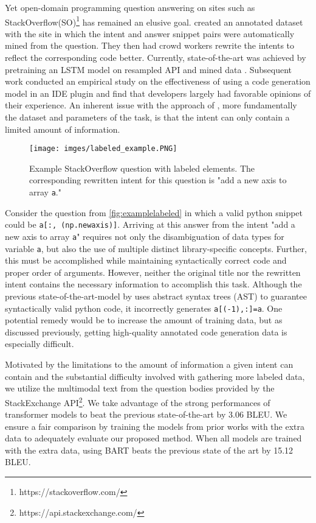 \documentclass[11pt]{article}
\newcommand{\codesnip}[1]{\small\texttt{#1}\normalsize}
\begin{document}
\indent Yet open-domain programming question answering on sites such as StackOverflow(SO)\footnote{https://stackoverflow.com/} has remained an elusive goal. \citet{yin2018learning} created an annotated dataset with the site in which the intent and answer snippet pairs were automatically mined from the question. They then had crowd workers rewrite the intents to reflect the corresponding code better. Currently, state-of-the-art was achieved by pretraining an LSTM model on resampled API and mined data \citep{xu-etal-2020-incorporating}. Subsequent work conducted an empirical study on the effectiveness of using a code generation model in an IDE plugin and find that developers largely had favorable opinions of their experience\citep{xu2021ide}. An inherent issue with the approach of \citet{xu-etal-2020-incorporating}, more fundamentally the dataset and parameters of the task, is that the intent can only contain a limited amount of information. 

\begin{figure}[ht]
    \centering
    \texttt{[image: imges/labeled\_example.PNG]}
    \caption{Example StackOverflow question with labeled elements. The corresponding rewritten intent for this question is "add a new axis to array \codesnip{a}."}
    \label{fig:examplelabeled}
\end{figure}
\indent Consider the question from \autoref{fig:examplelabeled}\textrm{ }in which a valid python snippet could be \codesnip{a[:, (np.newaxis)]}. Arriving at this answer from the intent "add a new axis to array \codesnip{a}" requires not only the disambiguation of data types for variable \codesnip{a}, but also the use of multiple distinct library-specific concepts. Further, this must be accomplished while maintaining syntactically correct code and proper order of arguments. However, neither the original title nor the rewritten intent contains the necessary information to accomplish this task. Although the previous state-of-the-art-model by \citet{xu-etal-2020-incorporating} uses abstract syntax trees (AST) to guarantee syntactically valid python code, it incorrectly generates \codesnip{a[(-1),:]=a}. One potential remedy would be to increase the amount of training data, but as discussed previously, getting high-quality annotated code generation data is especially difficult.

\indent Motivated by the limitations to the amount of information a given intent can contain and the substantial difficulty involved with gathering more labeled data, we utilize the multimodal text from the question bodies provided by the StackExchange API\footnote{https://api.stackexchange.com/}. We take advantage of the strong performances of transformer models to beat the previous state-of-the-art by 3.06 BLEU. We ensure a fair comparison by training the models from prior works with the extra data to adequately evaluate our proposed method. When all models are trained with the extra data, using BART beats the previous state of the art by 15.12 BLEU. 
\end{document}
